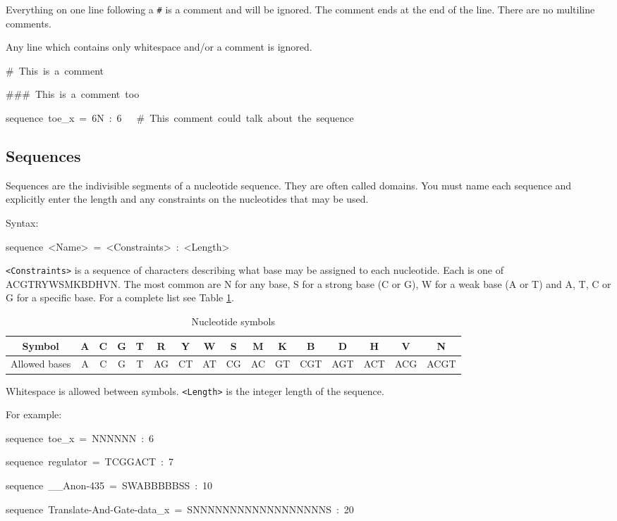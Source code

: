 \documentclass{article}
\newenvironment{code}
{\par\begin{list}{}{
\setlength{\rightmargin}{\leftmargin}
\setlength{\listparindent}{0pt}
\raggedright
\setlength{\itemsep}{0pt}
\setlength{\parsep}{0pt}
\normalfont\ttfamily}
 \item[]}
{\end{list}}
\begin{document}
Everything on one line following a \texttt{\#} is a comment and will
be ignored. The comment ends at the end of the line. There are no
multiline comments.

Any line which contains only whitespace and/or a comment is ignored.
\begin{code}
\#~This~is~a~comment

\#\#\#~This~is~a~comment~too

sequence~toe\_x~=~6N~:~6~~~\#~This~comment~could~talk~about~the~sequence~
\end{code}

\subsection{Sequences}

Sequences are the indivisible segments of a nucleotide sequence. They
are often called domains. You must name each sequence and explicitly
enter the length and any constraints on the nucleotides that may be
used.

Syntax:
\begin{code}
sequence~<Name>~=~<Constraints>~:~<Length>
\end{code}
\texttt{<Constraints>} is a sequence of characters describing what base may
be assigned to each nucleotide. Each is one of ACGTRYWSMKBDHVN. The
most common are N for any base, S for a strong base (C or G), W for
a weak base (A or T) and A, T, C or G for a specific base. For a complete
list see Table \ref{tab:Nucleotide-symbols}.

\begin{table}[b]
\noindent \begin{centering}
\begin{tabular}{|c|c|c|c|c|c|c|c|c|c|c|c|c|c|c|c|}
\hline 
Symbol & A & C & G & T & R & Y & W & S & M & K & B & D & H & V & N\\
\hline 
Allowed bases & A & C & G & T & AG & CT & AT & CG & AC & GT & CGT & AGT & ACT & ACG & ACGT\\
\hline
\end{tabular}
\par\end{centering}

\caption{\label{tab:Nucleotide-symbols}Nucleotide symbols}
\end{table}

Whitespace is allowed between symbols. \texttt{<Length>} is the integer length
of the sequence.

For example:
\begin{code}
sequence~toe\_x~=~NNNNNN~:~6

sequence~regulator~=~TCGGACT~:~7

sequence~\_\_Anon-435~=~SWABBBBBSS~:~10

sequence~Translate-And-Gate-data\_x~=~SNNNNNNNNNNNNNNNNNNS~:~20
\end{code}
\end{document}
